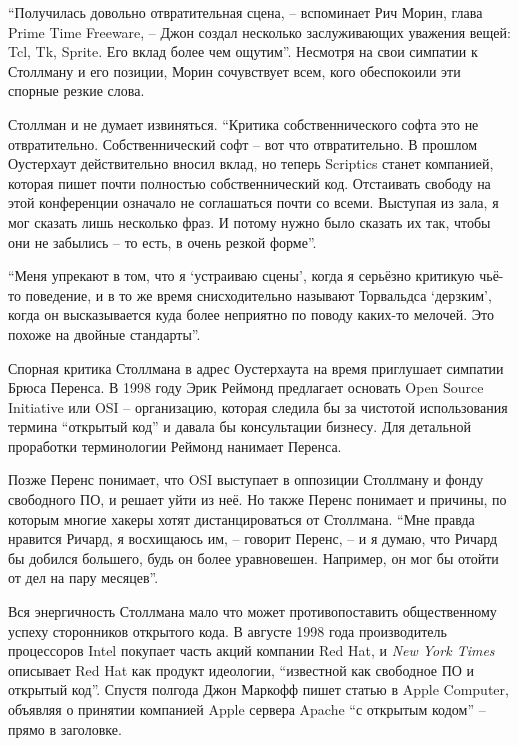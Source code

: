``Получилась довольно отвратительная сцена, -- вспоминает Рич Морин, глава Prime Time Freeware, -- Джон создал несколько заслуживающих уважения вещей: Tcl, Tk, Sprite. Его вклад более чем ощутим''. Несмотря на свои симпатии к Столлману и его позиции, Морин сочувствует всем, кого обеспокоили эти спорные резкие слова.

Столлман и не думает извиняться. ``Критика собственнического софта это не отвратительно. Собственнический софт -- вот что отвратительно. В прошлом Оустерхаут действительно вносил вклад, но теперь Scriptics станет компанией, которая пишет почти полностью собственнический код. Отстаивать свободу на этой конференции означало не соглашаться почти со всеми. Выступая из зала, я мог сказать лишь несколько фраз. И потому нужно было сказать их так, чтобы они не забылись -- то есть, в очень резкой форме''.

``Меня упрекают в том, что я `устраиваю сцены', когда я серьёзно критикую чьё-то поведение, и в то же время снисходительно называют Торвальдса `дерзким', когда он высказывается куда более неприятно по поводу каких-то мелочей. Это похоже на двойные стандарты''.

Спорная критика Столлмана в адрес Оустерхаута на время приглушает симпатии Брюса Перенса. В 1998 году Эрик Реймонд предлагает основать Open Source Initiative или OSI -- организацию, которая следила бы за чистотой использования термина ``открытый код'' и давала бы консультации бизнесу. Для детальной проработки терминологии Реймонд нанимает Перенса.

Позже Перенс понимает, что OSI выступает в оппозиции Столлману и фонду свободного ПО, и решает уйти из неё. Но также Перенс понимает и причины, по которым многие хакеры хотят дистанцироваться от Столлмана. ``Мне правда нравится Ричард, я восхищаюсь им, -- говорит Перенс, -- и я думаю, что Ричард бы добился большего, будь он более уравновешен. Например, он мог бы отойти от дел на пару месяцев''.

Вся энергичность Столлмана мало что может противопоставить общественному успеху сторонников открытого кода. В августе 1998 года производитель процессоров Intel покупает часть акций компании Red Hat, и \textit{New York Times} описывает Red Hat как продукт идеологии, ``известной как свободное ПО и открытый код''. Спустя полгода Джон Маркофф пишет статью в Apple Computer, объявляя о принятии компанией Apple сервера Apache ``с открытым кодом'' -- прямо в заголовке. 

